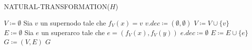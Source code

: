 \begin{algorithm}[H]
    \begin{algorithmic}[1]
        \caption{NATURAL-TRANSFORMATION($H$)}\label{alg:natural-transformation}
        \State $V \coloneqq \emptyset$
            \State Sia $v$ un supernodo tale che $f_V(x) = v$
            \State $v.dec \coloneqq (\emptyset, \emptyset)$
            \State $V \coloneqq V \cup \{v\}$
        \EndFor
        \State $E \coloneqq \emptyset$
            \State Sia $e$ un superarco tale che $e=(f_V(x), f_V(y))$
            \State $e.dec \coloneqq \emptyset$
            \State $E \coloneqq E \cup \{e\}$
        \EndFor
        \State $G \coloneqq (V, E)$
        \State \Return $G$
    \end{algorithmic}
\end{algorithm}